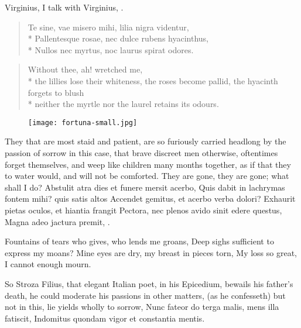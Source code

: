 {{Virginius, I talk with Virginius, \etc{}.
%
\begin{latin}
\begin{verse}
Te sine, vae misero mihi, lilia nigra videntur,\\*
Pallentesque rosae, nec dulce rubens hyacinthus,\\*
Nullos nec myrtus, noc laurus spirat odores.
\end{verse}
\end{latin}
\translationrule
\begin{verse}%
Without thee, ah! wretched me,\\*
the lillies lose their whiteness, the roses become pallid, the hyacinth forgets to blush\\*
neither the myrtle nor the laurel retains its odours.
\end{verse}

\cleartoleftpage{}
\begin{figure}[p]
  \begingroup
  \centering
  \texttt{[image: fortuna-small.jpg]}
  \label{fig:fortuna}
\end{figure}

\clearpage{}
They that are most staid and patient, are so furiously carried headlong
by the passion of sorrow in this case, that brave discreet men
otherwise, oftentimes forget themselves, and weep like children many
months together, as if that they to water would, and will not be
comforted. They are gone, they are gone; what shall I do?
Abstulit atra dies et funere mersit acerbo,
Quis dabit in lachrymas fontem mihi? quis satis altos
Accendet gemitus, et acerbo verba dolori?
Exhaurit pietas oculos, et hiantia frangit
Pectora, nec plenos avido sinit edere questus,
Magna adeo jactura premit, \etc{}.

Fountains of tears who gives, who lends me groans,
Deep sighs sufficient to express my moans?
Mine eyes are dry, my breast in pieces torn,
My loss so great, I cannot enough mourn.

So Stroza Filius, that elegant Italian poet, in his Epicedium, bewails
his father's death, he could moderate his passions in other matters,
(as he confesseth) but not in this, lie yields wholly to sorrow,
Nunc fateor do terga malis, mens illa fatiscit,
Indomitus quondam vigor et constantia mentis.

}}
